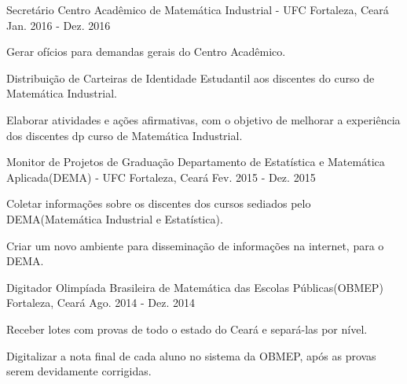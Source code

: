 \begin{cventries}
  \cventry
    {Secretário} %
    {Centro Acadêmico de Matemática Industrial - UFC} %
    {Fortaleza, Ceará} %
    {Jan. 2016 - Dez. 2016} %
    {
      \begin{cvitems} %
        \item {Gerar ofícios para demandas gerais do Centro Acadêmico.}
        \item {Distribuição de Carteiras de Identidade Estudantil aos discentes do curso de Matemática Industrial.}
        \item {Elaborar atividades e ações afirmativas, com o objetivo de melhorar a experiência dos discentes dp curso de Matemática Industrial.}
      \end{cvitems}
    }
\vskip 0.2cm
  \cventry
    {Monitor de Projetos de Graduação} %
    {Departamento de Estatística e Matemática Aplicada(DEMA) - UFC} %
    {Fortaleza, Ceará} %
    {Fev. 2015 - Dez. 2015} %
    {
      \begin{cvitems} %
        \item {Coletar informações sobre os discentes dos cursos sediados pelo DEMA(Matemática Industrial e Estatística).}
        \item {Criar um novo ambiente para disseminação de informações na internet, para o DEMA.}
      \end{cvitems}
    }
\vskip 0.2cm
  \cventry
    {Digitador} %
    {Olimpíada Brasileira de Matemática das Escolas Públicas(OBMEP) } %
    {Fortaleza, Ceará} %
    {Ago. 2014 - Dez. 2014} %
    {
      \begin{cvitems} %
        \item {Receber lotes com provas de todo o estado do Ceará e separá-las por nível.}
        \item {Digitalizar a nota final de cada aluno no sistema da OBMEP, após as provas serem devidamente corrigidas.}
      \end{cvitems}
    }
\end{cventries}

